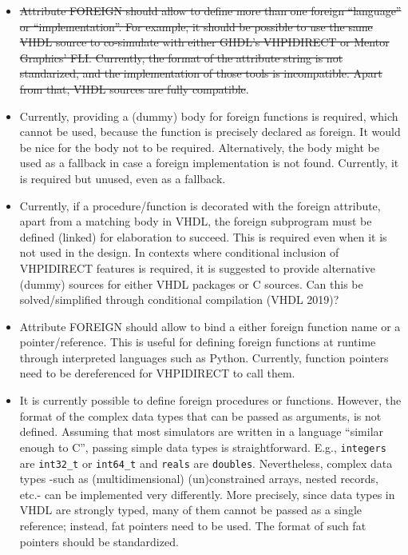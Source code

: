 \documentclass[
]{article}
\providecommand{\tightlist}{%
  \setlength{\itemsep}{0pt}\setlength{\parskip}{0pt}}
\begin{document}
\begin{itemize}
\tightlist
\item
  \st{Attribute FOREIGN should allow to define more than one foreign ``language'' or ``implementation''. For example, it should be possible to use the same VHDL source to co-simulate with either GHDL's VHPIDIRECT or Mentor Graphics' FLI. Currently, the format of the attribute string is not standarized, and the implementation of those tools is incompatible. Apart from that, VHDL sources are fully compatible}.
\item
  Currently, providing a (dummy) body for foreign functions is required, which cannot be used, because the function is precisely declared as foreign. It would be nice for the body not to be required. Alternatively, the body might be used as a fallback in case a foreign implementation is not found. Currently, it is required but unused, even as a fallback.
\item
  Currently, if a procedure/function is decorated with the foreign attribute, apart from a matching body in VHDL, the foreign subprogram must be defined (linked) for elaboration to succeed. This is required even when it is not used in the design. In contexts where conditional inclusion of VHPIDIRECT features is required, it is suggested to provide alternative (dummy) sources for either VHDL packages or C sources. Can this be solved/simplified through conditional compilation (VHDL 2019)?
\item
  Attribute FOREIGN should allow to bind a either foreign function name or a pointer/reference. This is useful for defining foreign functions at runtime through interpreted languages such as Python. Currently, function pointers need to be dereferenced for VHPIDIRECT to call them.
\item
  It is currently possible to define foreign procedures or functions. However, the format of the complex data types that can be passed as arguments, is not defined. Assuming that most simulators are written in a language ``similar enough to C'', passing simple data types is straightforward. E.g., \texttt{integers} are \texttt{int32\_t} or \texttt{int64\_t} and \texttt{reals} are \texttt{doubles}. Nevertheless, complex data types -such as (multidimensional) (un)constrained arrays, nested records, etc.- can be implemented very differently. More precisely, since data types in VHDL are strongly typed, many of them cannot be passed as a single reference; instead, fat pointers need to be used. The format of such fat pointers should be standardized.


\end{itemize}
\end{document}
